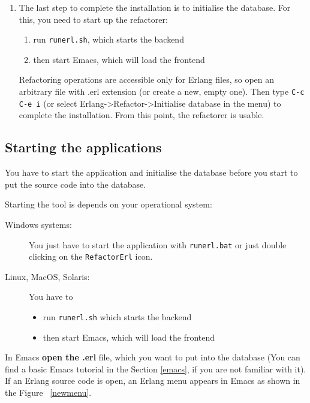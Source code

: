 \documentclass[12pt]{article}
\begin{document}
\begin{enumerate}
\item  The  last  step to  complete  the  installation  is to  initialise  the
database. For this, you need to start up the refactorer:
\begin{enumerate}
	\item run {\tt runerl.sh}, which starts the backend
 	\item then start Emacs, which will load the frontend
 \end{enumerate}
 

Refactoring operations  are accessible  only for Erlang  files, so  open an
arbitrary file with .erl extension (or  create a new, empty one). Then type
{\tt C-c C-e  i} (or select Erlang->Refactor->Initialise database  in the menu)
to complete the installation. From this point, the refactorer is usable.
\end{enumerate}

\subsection{Starting the applications}

You have to start the application and initialise the database before you start to put the source code into the database.

Starting the tool is depends on your operational system:

\begin{description}
	\item[Windows systems:] You just have to start the application with {\tt runerl.bat} or just double clicking on the {\tt RefactorErl} icon.
	\item[Linux, MacOS, Solaris:] You have to \begin{itemize}
		\item run {\tt runerl.sh} which starts the backend
		\item then start Emacs, which will load the frontend
	\end{itemize}
	
\end{description}

In Emacs {\bf open the .erl} file, which you want to put into the database 
(You can find a basic Emacs tutorial in the Section \ref{emacs}, if you are not familiar with it).
If an Erlang source code is open, an Erlang menu appears in Emacs as shown in the Figure ~\ref{newmenu}.
\end{document}
